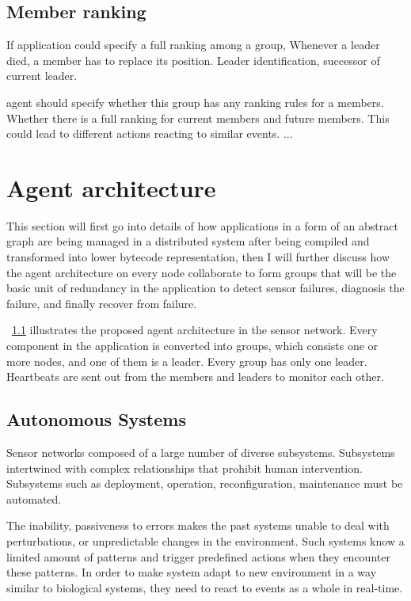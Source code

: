 \subsection{Member ranking}

If application could specify a full ranking among a group, 
Whenever a leader died, a member has to replace its position.
Leader identification, successor of current leader.

 agent should specify whether this group has any ranking rules for a members. Whether there is a full ranking for current members and future members. This could lead to different actions reacting to similar events. ...

\section{Agent architecture}

This section will first go into details of how applications in a form of an
abstract graph are being managed in a distributed system after being compiled 
and transformed into lower bytecode representation, then I will further discuss 
how the agent architecture on every node collaborate to form groups that will 
be the basic unit of redundancy in the application to detect sensor failures, 
diagnosis the failure, and finally recover from failure.

~\ref{} illustrates the proposed agent architecture in the sensor network.
Every component in the application is converted into groups, which consists one
or more nodes, and one of them is a leader. Every group has only one leader.
Heartbeats are sent out from the members and leaders to monitor each other.

\subsection{Autonomous Systems}

Sensor networks composed of a large number of diverse subsystems. Subsystems
intertwined with complex relationships that prohibit human intervention.
Subsystems such as deployment, operation, reconfiguration, maintenance must be
automated.

The inability, passiveness to errors makes the past systems unable to deal with
perturbations, or unpredictable changes in the environment. Such systems know
a limited amount of patterns and trigger predefined actions when they encounter
these patterns. In order to make system adapt to new environment in a way
similar to biological systems, they need to react to events as a whole in
real-time.

